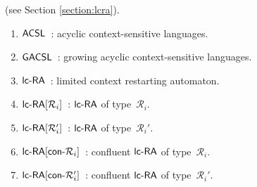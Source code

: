  (see Section \ref{section:lcra}).

\begin{enumerate}[]
\item $\textup{\sf ACSL}$\ : acyclic context-sensitive languages.
\item $\textup{\sf GACSL}$\ : growing acyclic context-sensitive languages.
\item $\lcRA$\ : limited context restarting automaton.
\item $\lcRA[i]$\ : $\lcRA$ of type~$\mathcal{R}_i$.
\item $\lcRAp[i]$\ : $\lcRA$ of type~$\mathcal{R}_i'$.
\item $\textup{\sf lc-RA$[\textup{\sf con-}\mathcal{R}_i]$}$\ : confluent $\lcRA$ of type~$\mathcal{R}_i$.
\item $\textup{\sf lc-RA$[\textup{\sf con-}\mathcal{R}_i']$}$\ : confluent $\lcRA$ of type~$\mathcal{R}_i'$.
\end{enumerate}
